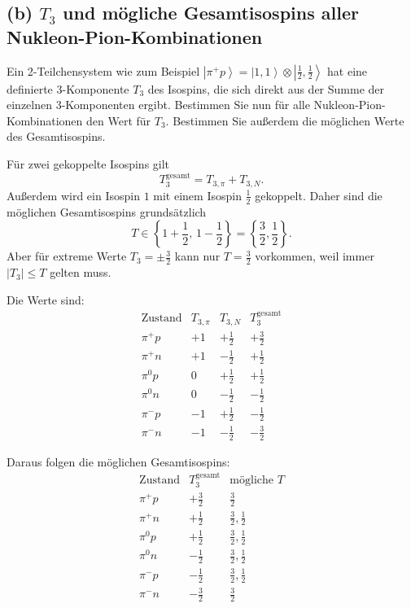 \documentclass[11pt,a4paper]{scrartcl}
\newcommand{\ket}[1]{\left|#1\right\rangle}
\begin{document}
\subsection*{(b) $T_3$ und mögliche Gesamtisospins aller Nukleon-Pion-Kombinationen}

Ein 2-Teilchensystem wie zum Beispiel $\ket{\pi^+p}=\ket{1,1}\otimes\ket{\frac12,\frac12}$ hat eine definierte 3-Komponente $T_3$ des Isospins, die sich direkt aus der Summe der einzelnen 3-Komponenten ergibt. Bestimmen Sie nun für alle Nukleon-Pion-Kombinationen den Wert für $T_3$. Bestimmen Sie außerdem die möglichen Werte des Gesamtisospins.

\begin{calculationbox}
Für zwei gekoppelte Isospins gilt
\[
T_3^{\mathrm{gesamt}}=T_{3,\pi}+T_{3,N}.
\]
Außerdem wird ein Isospin $1$ mit einem Isospin $\frac12$ gekoppelt. Daher sind die möglichen Gesamtisospins grundsätzlich
\[
T\in\left\{1+\frac12,\,1-\frac12\right\}
=\left\{\frac32,\frac12\right\}.
\]
Aber für extreme Werte $T_3=\pm\frac32$ kann nur $T=\frac32$ vorkommen, weil immer $|T_3|\le T$ gelten muss.

\begin{calculationbox}
Die Werte sind:
\[
\begin{array}{c|c|c|c}
\text{Zustand} & T_{3,\pi} & T_{3,N} & T_3^{\mathrm{gesamt}}\\
\hline
\pi^+p & +1 & +\frac12 & +\frac32\\
\pi^+n & +1 & -\frac12 & +\frac12\\
\pi^0p & 0 & +\frac12 & +\frac12\\
\pi^0n & 0 & -\frac12 & -\frac12\\
\pi^-p & -1 & +\frac12 & -\frac12\\
\pi^-n & -1 & -\frac12 & -\frac32
\end{array}
\]
\end{calculationbox}

\begin{calculationbox}
Daraus folgen die möglichen Gesamtisospins:
\[
\begin{array}{c|c|c}
\text{Zustand} & T_3^{\mathrm{gesamt}} & \text{mögliche }T\\
\hline
\pi^+p & +\frac32 & \frac32\\
\pi^+n & +\frac12 & \frac32,\frac12\\
\pi^0p & +\frac12 & \frac32,\frac12\\
\pi^0n & -\frac12 & \frac32,\frac12\\
\pi^-p & -\frac12 & \frac32,\frac12\\
\pi^-n & -\frac32 & \frac32
\end{array}
\]
\end{calculationbox}
\end{calculationbox}
\end{document}
